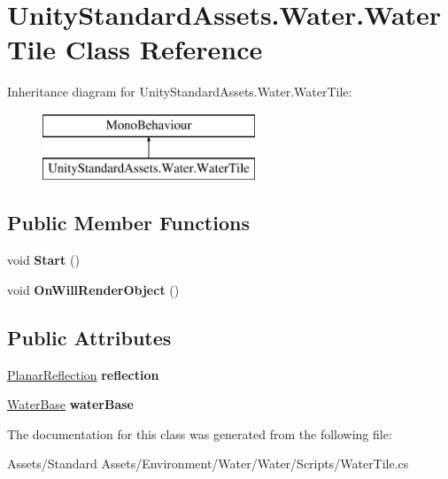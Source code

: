\hypertarget{class_unity_standard_assets_1_1_water_1_1_water_tile}{}\section{Unity\+Standard\+Assets.\+Water.\+Water\+Tile Class Reference}
\label{class_unity_standard_assets_1_1_water_1_1_water_tile}
Inheritance diagram for Unity\+Standard\+Assets.\+Water.\+Water\+Tile\+:\begin{figure}[H]
\begin{center}
\leavevmode
\includegraphics[height=2.000000cm]{class_unity_standard_assets_1_1_water_1_1_water_tile}
\end{center}
\end{figure}
\subsection*{Public Member Functions}
\begin{DoxyCompactItemize}
\item 
void {\bfseries Start} ()\hypertarget{class_unity_standard_assets_1_1_water_1_1_water_tile_a9dcac1ce9deb6f36c873828971f4c418}{}\label{class_unity_standard_assets_1_1_water_1_1_water_tile_a9dcac1ce9deb6f36c873828971f4c418}

\item 
void {\bfseries On\+Will\+Render\+Object} ()\hypertarget{class_unity_standard_assets_1_1_water_1_1_water_tile_a4afbc3cc313c5b28f14ff2af72657c40}{}\label{class_unity_standard_assets_1_1_water_1_1_water_tile_a4afbc3cc313c5b28f14ff2af72657c40}

\end{DoxyCompactItemize}
\subsection*{Public Attributes}
\begin{DoxyCompactItemize}
\item 
\hyperlink{class_unity_standard_assets_1_1_water_1_1_planar_reflection}{Planar\+Reflection} {\bfseries reflection}\hypertarget{class_unity_standard_assets_1_1_water_1_1_water_tile_afbbdc233e3c3eb9bdb994cd649761f5d}{}\label{class_unity_standard_assets_1_1_water_1_1_water_tile_afbbdc233e3c3eb9bdb994cd649761f5d}

\item 
\hyperlink{class_unity_standard_assets_1_1_water_1_1_water_base}{Water\+Base} {\bfseries water\+Base}\hypertarget{class_unity_standard_assets_1_1_water_1_1_water_tile_a67837989d45fc4836b938f8899a35bb3}{}\label{class_unity_standard_assets_1_1_water_1_1_water_tile_a67837989d45fc4836b938f8899a35bb3}

\end{DoxyCompactItemize}


The documentation for this class was generated from the following file\+:\begin{DoxyCompactItemize}
\item 
Assets/\+Standard Assets/\+Environment/\+Water/\+Water/\+Scripts/Water\+Tile.\+cs\end{DoxyCompactItemize}
